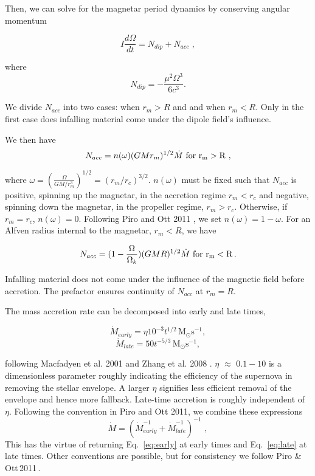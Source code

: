 \documentclass{article}
\begin{document}
Then, we can solve for the magnetar period dynamics by conserving angular momentum

\begin{equation}
I \frac{d\Omega}{dt} = N_{dip} + N_{acc}\,\,,
\end{equation}

where
\begin{equation}
N_{dip}= -\frac{\mu^{2}\Omega^{3}}{6 c^{3}}.
\end{equation}

We divide $N_{acc}$ into two cases: when $r_m>R$ and and when $r_m<R$. Only in the first case does infalling material come under the dipole field's influence.

We then have
\begin{equation}\label{eq:nacc1}
N_{acc}= n(\omega) (GMr_m)^{1/2} \dot{M}\, \,  \rm{for \,\, r_m>R}\,\,,
\end{equation}

where $\omega=(\frac{\Omega}{GM/r_m^3})^{1/2}=(r_m/r_c)^{3/2}$. $n(\omega)$ must be fixed such that $N_{acc}$ is positive, spinning up the magnetar, in the accretion regime $r_m<r_c$ and negative, spinning down the magnetar, in the propeller regime, $r_m>r_c$. Otherwise, if $r_m=r_c$, $n(\omega)=0$. Following Piro and Ott 2011 \cite{Piro:2011ed}, we set $n(\omega)=1-\omega$. For an Alfven radius internal to the magnetar, $r_m<R$, we have

\begin{equation}\label{eq:nacc2}
N_{acc}=(1-\frac{\Omega}{\Omega_k})(GMR)^{1/2} \dot{M}\, \,  \rm{for \,\, r_m<R}\,.
\end{equation}

Infalling material does not come under the influence of the magnetic field before accretion. The prefactor ensures continuity of $N_{acc}$ at $r_m=R$.

The mass accretion rate can be decomposed into early and late times,

\begin{equation} \label{eq:early}
\dot{M}_{early} = \eta 10^{-3}t^{1/2} \, \mathrm{M_{\odot }s^{-1}},
\end{equation}
\begin{equation} \label{eq:late}
\dot{M}_{late}=50 t^{-5/3}\, \mathrm{M_{\odot} s^{-1}},
\end{equation}

following Macfadyen et al. 2001 \cite{Macfadyen:1999mk} and Zhang et al. 2008 \cite{Zhang:2007nw}. $\eta$ $\approx$ $0.1-10$ is a dimensionless parameter roughly indicating the efficiency of the supernova in removing the stellar envelope. A larger $\eta$ signifies less efficient removal of the envelope and hence more fallback. Late-time accretion is roughly independent of $\eta$.
Following the convention in Piro and Ott 2011, we combine these expressions
\begin{equation}
\dot{M}=(\dot{M}_{early}^{-1}+\dot{M}_{late}^{-1})^{-1}\,\,,
\end{equation}
This has the virtue of returning Eq.~\ref{eq:early} at early times and Eq.~\ref{eq:late} at late times. Other conventions are possible, but for consistency we follow Piro \& Ott\,2011\,\cite{Piro:2011ed}.
\end{document}
